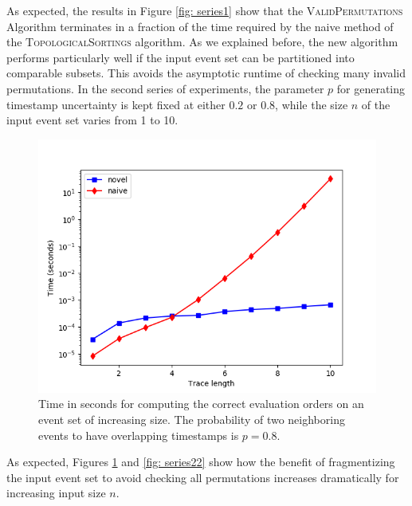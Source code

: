 As expected, the results in Figure \ref{fig: series1} show that the \textsc{ValidPermutations} Algorithm terminates in a fraction of the time required by the naive method of the \textsc{TopologicalSortings} algorithm.
As we explained before, the new algorithm performs particularly well if the input event set can be partitioned into comparable subsets.
This avoids the asymptotic runtime of checking many invalid permutations.
In the second series of experiments, the parameter $p$ for generating timestamp uncertainty is kept fixed at either $0.2$ or $0.8$, while the size $n$ of the input event set varies from 1 to 10.
%
%
%
\begin{figure}
	\centering
	\includegraphics[width=0.8\columnwidth]{figures/fixed_p_08_logscale.png}
	\caption{Time in seconds for computing the correct evaluation orders on an event set of increasing size. The probability of two neighboring events to have overlapping timestamps is $p=0.8$.}
	\label{fig: series21}
\end{figure}
%
%
As expected, Figures \ref{fig: series21} and \ref{fig: series22} show how the benefit of fragmentizing the input event set to avoid checking all permutations increases dramatically for increasing input size $n$.
%
%
%
